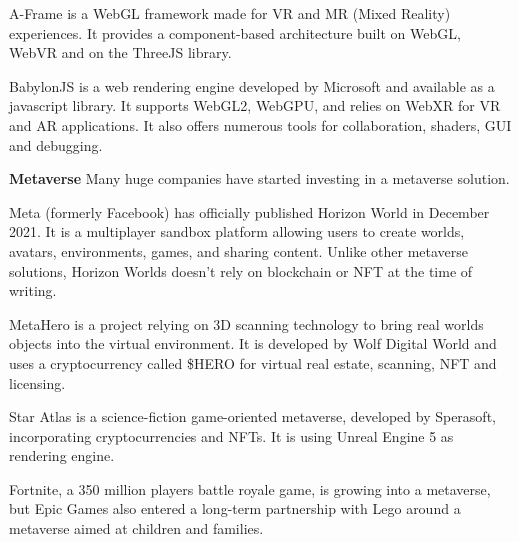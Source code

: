 A-Frame is a WebGL framework made for VR and MR (Mixed Reality) experiences. It provides a component-based architecture built on WebGL, WebVR and on the ThreeJS library. \cite{}

BabylonJS is a web rendering engine developed by Microsoft and available as a javascript library. It supports WebGL2, WebGPU, and relies on WebXR for VR and AR applications. It also offers numerous tools for collaboration, shaders, GUI and debugging. \cite{}

\textbf{Metaverse} Many huge companies have started investing in a metaverse solution.

Meta (formerly Facebook) has officially published Horizon World in December 2021. It is a multiplayer sandbox platform allowing users to create worlds, avatars, environments, games, and sharing content. Unlike other metaverse solutions, Horizon Worlds doesn't rely on blockchain or NFT at the time of writing.\cite{}

MetaHero is a project relying on 3D scanning technology to bring real worlds objects into the virtual environment. It is developed by Wolf Digital World and uses a cryptocurrency called \$HERO for virtual real estate, scanning, NFT and licensing. \cite{}

Star Atlas is a science-fiction game-oriented metaverse, developed by Sperasoft, incorporating cryptocurrencies and NFTs. It is using Unreal Engine 5 as rendering engine. \cite{}

Fortnite, a 350 million players battle royale game, is growing into a metaverse, but Epic Games also entered a long-term partnership with Lego around a metaverse aimed at children and families. \cite{}










